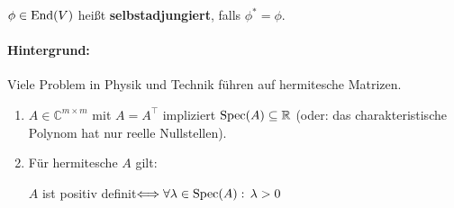 \documentclass[parskip,a4paper,twoside,DIV15,BCOR12mm]{scrbook}
\begin{document}
\begin{definition}
\(\phi\in\operatorname{End}(V)\) heißt \textbf{selbstadjungiert}, falls \(\phi^{*}=\phi\).
\end{definition}
\begin{comment}
\begin{enumerate}
\item \(\phi\) ist selbstadjungiert impliziert \(\phi\) ist normal.
\item Ist \(\dim V<\infty,\, B\) Orthonormalbasis und \(A:=D_{BB}(\phi)\), dann
ist \(\phi\) selbstadjungiert genau dann wenn \(A=A^{*}\), d.h. \(A\) ist 
hermitesch.
\end{enumerate}
\end{comment}
\paragraph{Hintergrund:}{Viele Problem in Physik und Technik führen auf 
hermitesche Matrizen.}
\begin{theo}
\label{Satz 18.3}
\begin{enumerate}
\item \(A\in\mathbb{C}^{m\times m}\) mit \(A=A^{\top}\) impliziert 
    \(\operatorname{Spec}(A)\subseteq\mathbb{R}\) (oder: das charakteristische Polynom hat nur
reelle Nullstellen).
\item Für hermitesche \(A\) gilt:
\begin{center}
\(A\) ist positiv definit\(\Longleftrightarrow\forall\lambda\in\operatorname{Spec}(A):\,\lambda>0\)
\end{center}
\end{enumerate}
\end{theo}
\end{document}
